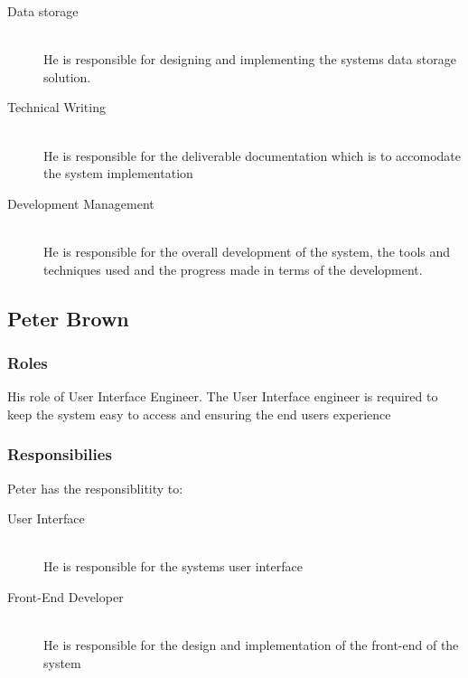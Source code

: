 \begin{itemize}
	\begin{description}
		\item[Data storage] \hfill \\ He is responsible for designing and implementing the systems data storage solution.
		\item[Technical Writing] \hfill \\ He is responsible for the deliverable documentation which is to accomodate the system implementation
		\item[Development Management] \hfill \\ He is responsible for the overall development of the system, the tools and techniques used and the progress made in terms of the development.
	\end{description}


\subsection{Peter Brown}


\subsubsection{Roles}

	His role of User Interface Engineer. The User Interface engineer is required to keep the system easy to access and ensuring the end users experience 


\subsubsection{Responsibilies}

	Peter has the responsiblitity to:

	\begin{description}
		\item[User Interface] \hfill \\ He is responsible for the systems user interface
		\item[Front-End Developer] \hfill \\ He is responsible for the design and implementation of the front-end of the system
	\end{description}


\end{itemize}
